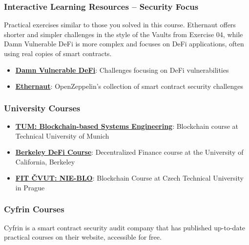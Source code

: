 \documentclass[12pt]{article}
\begin{document}
\subsubsection*{Interactive Learning Resources -- Security Focus}

Practical exercises similar to those you solved in this course. Ethernaut
offers shorter and simpler challenges in the style of the Vaults from Exercise
04, while Damn Vulnerable DeFi is more complex and focuses on DeFi
applications, often using real copies of smart contracts.

\begin{itemize}
    \item \textbf{\href{https://www.damnvulnerabledefi.xyz/}{Damn Vulnerable DeFi}}: Challenges focusing on DeFi vulnerabilities
    \item \textbf{\href{https://ethernaut.openzeppelin.com/}{Ethernaut}}: OpenZeppelin's collection of smart contract security challenges
\end{itemize}

\subsubsection*{University Courses}

\begin{itemize}
    \item \textbf{\href{https://github.com/sebischair/bbse}{TUM: Blockchain-based Systems Engineering}}: Blockchain course at Technical University of Munich
    \item \textbf{\href{https://rdi.berkeley.edu/berkeley-defi/f24}{Berkeley DeFi Course}}: Decentralized Finance course at the University of California, Berkeley
    \item \textbf{\href{https://courses.fit.cvut.cz/NIE-BLO/index.html}{FIT ČVUT: NIE-BLO}}: Blockchain Course at Czech Technical University in Prague
\end{itemize}

\subsubsection*{Cyfrin Courses}

Cyfrin is a smart contract security audit company that has published up-to-date
practical courses on their website, accessible for free.
\end{document}
